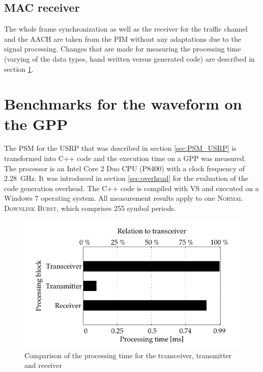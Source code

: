 \subsection{MAC receiver}
The whole frame synchronization as well as the receiver for the traffic channel and the \ac{AACH} are taken from the \ac{PIM} without any adaptations due to the signal processing. Changes that are made for measuring the processing time (varying of the data types, hand written versus generated code) are described in section \ref{sec:bench_gpp}.

\section{Benchmarks for the waveform on the GPP}
\label{sec:bench_gpp}

The \ac{PSM} for the \ac{USRP} that was described in section \ref{sec:PSM_USRP} is transformed into C++ code and the execution time on a \ac{GPP} was measured. The processor is an Intel Core 2 Duo CPU (P8400) with a clock frequency of \SI{2.28}{GHz}. It was introduced in section \ref{sec:overhead} for the evaluation of the code generation overhead. The C++ code is compiled with \ac{VS} and executed on a Windows 7 operating system. All measurement results apply to one \textsc{Normal Downlink Burst}, which comprises 255 symbol periods.

\begin{figure}[htb]
	\centering
		\includegraphics{../kapitel05/figures/bench_gpp_trx.pdf}
	\caption{Comparison of the processing time for the transceiver, transmitter and receiver}
	\label{fig:bench_gpp_trx}
\end{figure}

